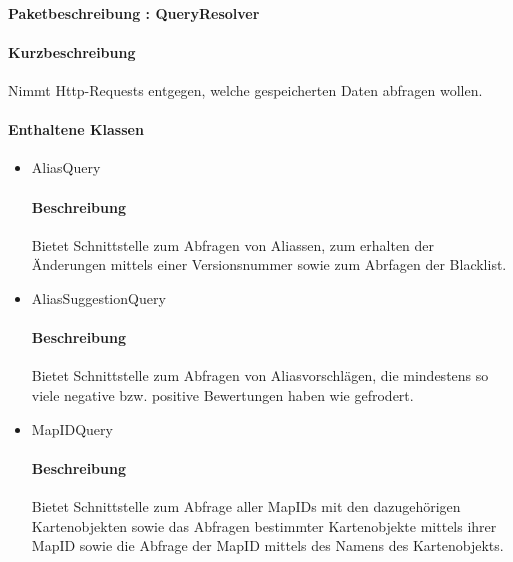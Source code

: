 \paragraph{Paketbeschreibung : QueryResolver}%
\paragraph*{Kurzbeschreibung}
Nimmt Http-Requests entgegen, welche gespeicherten Daten abfragen wollen.
\paragraph*{Enthaltene Klassen}
\begin{itemize}
    \item AliasQuery
    		\paragraph*{Beschreibung}
            Bietet Schnittstelle zum Abfragen von Aliassen, zum erhalten der Änderungen mittels einer Versionsnummer sowie zum Abrfagen der Blacklist.
    \item AliasSuggestionQuery
    		\paragraph*{Beschreibung}
    		Bietet Schnittstelle zum Abfragen von Aliasvorschlägen, die mindestens so viele negative bzw. positive Bewertungen haben wie gefrodert.
    \item MapIDQuery
    		\paragraph*{Beschreibung}
    		Bietet Schnittstelle zum Abfrage aller MapIDs mit den dazugehörigen Kartenobjekten sowie das Abfragen bestimmter Kartenobjekte mittels ihrer MapID sowie die Abfrage
            der MapID mittels des Namens des Kartenobjekts.

\end{itemize}